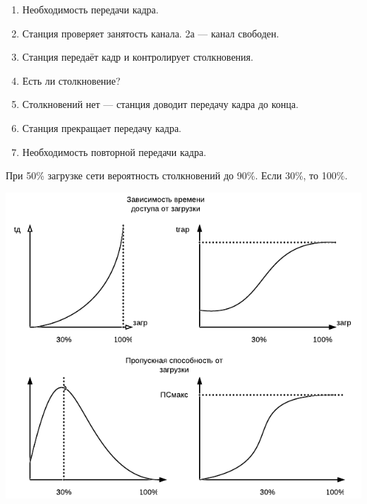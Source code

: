 \documentclass[12pt, russian, oneside, article]{ncc}
\begin{document}
\begin{itemize}
\begin{enumerate}
\item Необходимость передачи кадра.
\item Станция проверяет занятость канала. 2а — канал свободен.
\item Станция передаёт кадр и контролирует столкновения.
\item Есть ли столкновение?
\item Столкновений нет — станция доводит передачу кадра до конца.
\item Станция прекращает передачу кадра.
\item Необходимость повторной передачи кадра.
\end{enumerate}

При 50\% загрузке сети вероятность столкновений до 90\%. Если 30\%, то 100\%.

\includegraphics[]{images/SiSPI/time.png}

\end{itemize} %
\end{document}
